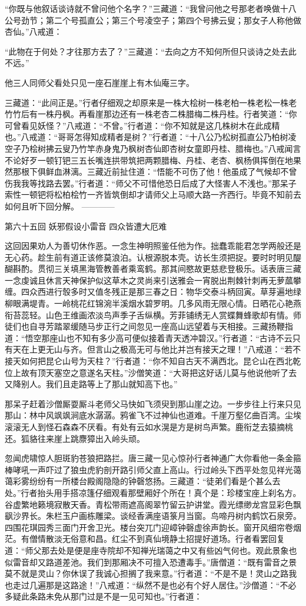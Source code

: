 \documentclass[12pt,UTF8]{ctexbook}
\begin{document}
“你既与他叙话谈诗就不曾问他个名字？”三藏道：“我曾问他之号那老者唤做十八公号劲节；第二个号孤直公；第三个号凌空子；第四个号拂云叟；那女子人称他做杏仙。”八戒道：

“此物在于何处？才往那方去了？”三藏道：“去向之方不知何所但只谈诗之处去此不远。”

他三人同师父看处只见一座石崖崖上有木仙庵三字。

三藏道：“此间正是。”行者仔细观之却原来是一株大桧树一株老柏一株老松一株老竹竹后有一株丹枫。再看崖那边还有一株老杏二株腊梅二株丹桂。行者笑道：“你可曾看见妖怪？”八戒道：“不曾。”行者道：“你不知就是这几株树木在此成精也。”八戒道：“哥哥怎得知成精者是树？”行者道：“十八公乃松树孤直公乃柏树凌空子乃桧树拂云叟乃竹竿赤身鬼乃枫树杏仙即杏树女童即丹桂、腊梅也。”八戒闻言不论好歹一顿钉钯三五长嘴连拱带筑把两颗腊梅、丹桂、老杏、枫杨俱挥倒在地果然那根下俱鲜血淋漓。三藏近前扯住道：“悟能不可伤了他！他虽成了气候却不曾伤我我等找路去罢。”行者道：“师父不可惜他恐日后成了大怪害人不浅也。”那呆子索性一顿钯将松柏桧竹一齐皆筑倒却才请师父上马顺大路一齐西行。毕竟不知前去如何且听下回分解。
------------

第六十五回 妖邪假设小雷音 四众皆遭大厄难

这回因果劝人为善切休作恶。一念生神明照鉴任他为作。拙蠢乖能君怎学两般还是无心药。趁生前有道正该修莫浪泊。认根源脱本壳。访长生须把捉。要时时明见醍醐斟酌。贯彻三关填黑海管教善者乘鸾鹤。那其间愍故更慈悲登极乐。话表唐三藏一念虔诚且休言天神保护似这草木之灵尚来引送雅会一宵脱出荆棘针刺再无萝蓏攀缠。四众西进行彀多时又值冬残正是那三春之日：物华交泰斗柄回寅。草芽遍地绿柳眼满堤青。一岭桃花红锦涴半溪烟水碧罗明。几多风雨无限心情。日晒花心艳燕衔苔蕊轻。山色王维画浓淡鸟声季子舌纵横。芳菲铺绣无人赏蝶舞蜂歌却有情。师徒们也自寻芳踏翠缓随马步正行之间忽见一座高山远望着与天相接。三藏扬鞭指道：“悟空那座山也不知有多少高可便似接着青天透冲碧汉。”行者道：“古诗不云只有天在上更无山与齐。但言山之极高无可与他比并岂有接天之理！”八戒道：“若不接天如何把昆仑山号为天柱？”行者道：“你不知自古天不满西北。昆仑山在西北乾位上故有顶天塞空之意遂名天柱。”沙僧笑道：“大哥把这好话儿莫与他说他听了去又降别人。我们且走路等上了那山就知高下也。”

那呆子赶着沙僧厮耍厮斗老师父马快如飞须臾到那山崖之边。一步步往上行来只见那山：林中风飒飒涧底水潺潺。鸦雀飞不过神仙也道难。千崖万壑亿曲百湾。尘埃滚滚无人到怪石森森不厌看。有处有云如水滉是方是树鸟声繁。鹿衔芝去猿摘桃还。狐貉往来崖上跳麖獐出入岭头顽。

忽闻虎啸惊人胆斑豹苍狼把路拦。唐三藏一见心惊孙行者神通广大你看他一条金箍棒哮吼一声吓过了狼虫虎豹剖开路引师父直上高山。行过岭头下西平处忽见祥光蔼蔼彩雾纷纷有一所楼台殿阁隐隐的钟磬悠扬。三藏道：“徒弟们看是个甚么去处。”行者抬头用手搭凉篷仔细观看那壁厢好个所在！真个是：珍楼宝座上刹名方。谷虚繁地籁境寂散天香。青松带雨遮高阁翠竹留云护讲堂。霞光缥缈龙宫显彩色飘飖沙界长。朱栏玉户画栋雕梁。谈经香满座语箓月当窗。鸟啼丹树内鹤饮石泉旁。四围花琪园秀三面门开舍卫光。楼台突兀门迎嶂钟磬虚徐声韵长。窗开风细帘卷烟茫。有僧情散淡无俗意和昌。红尘不到真仙境静土招提好道场。行者看罢回复道：“师父那去处是便是座寺院却不知禅光瑞蔼之中又有些凶气何也。观此景象也似雷音却又路道差池。我们到那厢决不可擅入恐遭毒手。”唐僧道：“既有雷音之景莫不就是灵山？你休误了我诚心担搁了我来意。”行者道：“不是不是！灵山之路我也走过几遍那是这路途！”八戒道：“纵然不是也必有个好人居住。”沙僧道：“不必多疑此条路未免从那门过是不是一见可知也。”行者道：
\end{document}
